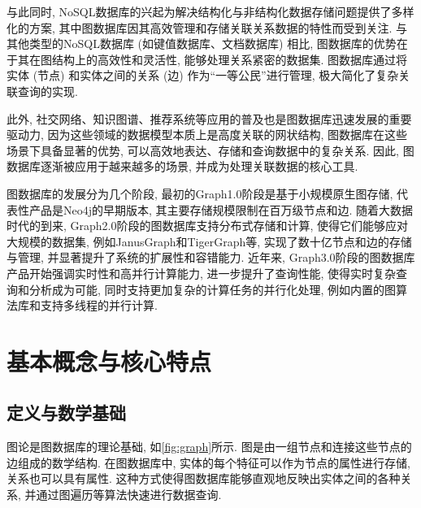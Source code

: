\documentclass[12pt,hyperref,a4paper,UTF8]{ctexart}
\begin{document}
与此同时, NoSQL数据库的兴起为解决结构化与非结构化数据存储问题提供了多样化的方案, 其中图数据库因其高效管理和存储关联关系数据的特性而受到关注. 与其他类型的NoSQL数据库 (如键值数据库、文档数据库) 相比, 图数据库的优势在于其在图结构上的高效性和灵活性, 能够处理关系紧密的数据集. 图数据库通过将实体 (节点) 和实体之间的关系 (边) 作为“一等公民”进行管理, 极大简化了复杂关联查询的实现.

此外, 社交网络、知识图谱、推荐系统等应用的普及也是图数据库迅速发展的重要驱动力, 因为这些领域的数据模型本质上是高度关联的网状结构, 图数据库在这些场景下具备显著的优势, 可以高效地表达、存储和查询数据中的复杂关系. 因此, 图数据库逐渐被应用于越来越多的场景, 并成为处理关联数据的核心工具.

图数据库的发展分为几个阶段, 最初的Graph1.0阶段是基于小规模原生图存储, 代表性产品是Neo4j的早期版本, 其主要存储规模限制在百万级节点和边. 随着大数据时代的到来, Graph2.0阶段的图数据库支持分布式存储和计算, 使得它们能够应对大规模的数据集, 例如JanusGraph和TigerGraph等, 实现了数十亿节点和边的存储与管理, 并显著提升了系统的扩展性和容错能力. 近年来, Graph3.0阶段的图数据库产品开始强调实时性和高并行计算能力, 进一步提升了查询性能, 使得实时复杂查询和分析成为可能, 同时支持更加复杂的计算任务的并行化处理, 例如内置的图算法库和支持多线程的并行计算.

\section{基本概念与核心特点}

\subsection{定义与数学基础}
图论是图数据库的理论基础, 如\autoref{fig:graph}所示. 图是由一组节点和连接这些节点的边组成的数学结构. 在图数据库中, 实体的每个特征可以作为节点的属性进行存储, 关系也可以具有属性. 这种方式使得图数据库能够直观地反映出实体之间的各种关系, 并通过图遍历等算法快速进行数据查询.
\end{document}
